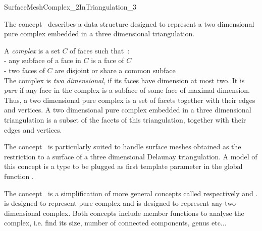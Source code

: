 

\begin{ccRefConcept}{SurfaceMeshComplex_2InTriangulation_3}


\ccDefinition
  
The concept \ccRefName\ describes a data structure
designed  to represent a  two dimensional pure complex 
embedded in a three dimensional triangulation.

A {\em complex} is a set $C$ of faces such that~:\\
- any subface of a face in $C$ is a face of $C$ \\
- two faces of $C$ are disjoint or share a common subface \\
The complex is {\em two dimensional}, if its faces have dimension at most
two. It is {\em pure} if any face in the complex is a subface
of some face of maximal dimension.
Thus, a two dimensional pure complex is a set of facets
together with their edges and vertices.
A  two dimensional pure complex  embedded 
in a three dimensional triangulation
is a subset of the  facets 
of this triangulation, together with their edges and vertices.



The concept \ccRefName\  is particularly suited to handle
surface meshes obtained as the restriction to a surface of 
a  three dimensional Delaunay triangulation.
A model of this concept is a type to be plugged as first template
parameter in the global
function .


The concept \ccRefName\   is a simplification of more general concepts called
 respectively  and
.
 is  designed to represent  pure complex
and  is designed to represent any
two dimensional complex. 
Both concepts include member functions to analyse the complex,
i.e. find its size, number of connected components, genus etc... 


\end{ccRefConcept}
